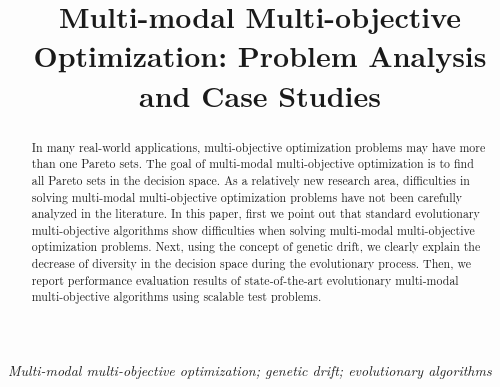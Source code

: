 \documentclass[conference]{IEEEtran}
\begin{document}
\title{Multi-modal Multi-objective Optimization: Problem Analysis and Case Studies
}
\author{
}

\maketitle

\begin{abstract}
In many real-world applications, multi-objective optimization problems may have more than one Pareto sets. The goal of multi-modal multi-objective optimization is to find all Pareto sets in the decision space. As a relatively new research area, difficulties in solving multi-modal multi-objective optimization problems have not been carefully analyzed in the literature. In this paper, first we point out that standard evolutionary multi-objective algorithms show difficulties when solving multi-modal multi-objective optimization problems. Next, using the concept of genetic drift, we clearly explain the decrease of diversity in the decision space during the evolutionary process. Then, we report performance evaluation results of state-of-the-art evolutionary multi-modal multi-objective algorithms using scalable test problems.
\end{abstract}

\bigskip %

\begin{IEEEkeywords}
\textit{Multi-modal multi-objective optimization; genetic drift; evolutionary algorithms}
\end{IEEEkeywords}
\end{document}
